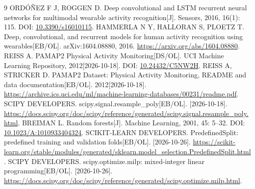 \documentclass[UTF8,zihao=-4,a4paper,fontset=windows]{ctexart}
\begin{document}
\clearpage
\begin{thebibliography}{9}
 ORDÓÑEZ F J, ROGGEN D. Deep convolutional and LSTM recurrent neural networks for multimodal wearable activity recognition[J]. Sensors, 2016, 16(1): 115. DOI: \href{https://doi.org/10.3390/s16010115}{10.3390/s16010115}.
 HAMMERLA N Y, HALLORAN S, PLOETZ T. Deep, convolutional, and recurrent models for human activity recognition using wearables[EB/OL]. arXiv:1604.08880, 2016. \url{https://arxiv.org/abs/1604.08880}.
 REISS A. PAMAP2 Physical Activity Monitoring[DS/OL]. UCI Machine Learning Repository, 2012[2026-10-18]. DOI: \href{https://doi.org/10.24432/C5NW2H}{10.24432/C5NW2H}.
 REISS A, STRICKER D. PAMAP2 Dataset: Physical Activity Monitoring, README and data documentation[EB/OL]. 2012[2026-10-18]. \url{https://archive.ics.uci.edu/ml/machine-learning-databases/00231/readme.pdf}.
 SCIPY DEVELOPERS. scipy.signal.resample\_poly[EB/OL]. [2026-10-18]. \url{https://docs.scipy.org/doc/scipy/reference/generated/scipy.signal.resample_poly.html}.
 BREIMAN L. Random forests[J]. Machine Learning, 2001, 45: 5--32. DOI: \href{https://doi.org/10.1023/A:1010933404324}{10.1023/A:1010933404324}.
 SCIKIT-LEARN DEVELOPERS. PredefinedSplit: predefined training and validation folds[EB/OL]. [2026-10-26]. \url{https://scikit-learn.org/stable/modules/generated/sklearn.model_selection.PredefinedSplit.html}.
 SCIPY DEVELOPERS. scipy.optimize.milp: mixed-integer linear programming[EB/OL]. [2026-10-26]. \url{https://docs.scipy.org/doc/scipy/reference/generated/scipy.optimize.milp.html}.
\end{thebibliography}
\end{document}
